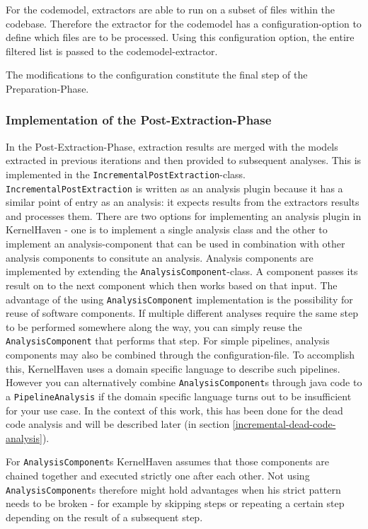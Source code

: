 \documentclass[a4paper]{article}
\begin{document}
For the codemodel, extractors are able to run on a subset of files within the codebase. Therefore the extractor for the codemodel has a configuration-option to define which files are to be processed. Using this configuration option, the entire filtered list is passed to the codemodel-extractor.


The modifications to the configuration constitute the final step of the Preparation-Phase.

\subsubsection{Implementation of the Post-Extraction-Phase}

In the Post-Extraction-Phase, extraction results are merged with the models extracted in previous iterations and then provided to subsequent analyses. This is implemented in the \texttt{IncrementalPostExtraction}-class. 
\texttt{IncrementalPostExtraction} is written as an analysis plugin because it has a similar point of entry as an analysis: it expects results from the extractors results and processes them. There are two options for implementing an analysis plugin in KernelHaven - one is to implement a single analysis class and the other to implement an analysis-component that can be used in combination with other analysis components to consitute an analysis. Analysis components are implemented by extending the \texttt{AnalysisComponent}-class. A component passes its result on to the next component which then works based on that input. The advantage of the using \texttt{AnalysisComponent} implementation is the possibility for reuse of software components. If multiple different analyses require the same step to be performed somewhere along the way, you can simply reuse the \texttt{AnalysisComponent} that performs that step. For simple pipelines, analysis components may also be combined through the configuration-file. To accomplish this, KernelHaven uses a domain specific language to describe such pipelines. However you can alternatively combine \texttt{AnalysisComponent}s through java code to a \texttt{PipelineAnalysis} if the domain specific language turns out to be insufficient for your use case. In the context of this work, this has been done for the dead code analysis and will be described later (in section \ref{incremental-dead-code-analysis}).

For \texttt{AnalysisComponent}s KernelHaven assumes that those components are chained together and executed strictly one after each other. Not using \texttt{AnalysisComponent}s therefore might hold advantages when his strict pattern needs to be broken - for example by skipping steps or repeating a certain step depending on the result of a subsequent step.
\end{document}
